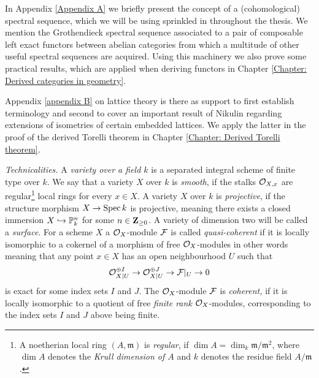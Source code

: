

In Appendix \ref{Appendix A} we briefly present the concept of a (cohomological) spectral sequence, which we will be using sprinkled in throughout the thesis. We mention the Grothendieck spectral sequence associated to a pair of composable left exact functors between abelian categories from which a multitude of other useful spectral sequences are acquired. Using this machinery we also prove some practical results, which are applied when deriving functors in Chapter \ref{Chapter: Derived categories in geometry}. 

Appendix \ref{appendix B} on lattice theory is there as support to first establish terminology and second to cover an important result of Nikulin \cite{Nikulin1980} regarding extensions of isometries of certain embedded lattices. We apply the latter in the proof of the derived Torelli theorem in Chapter \ref{Chapter: Derived Torelli theorem}. 

\vspace{0.3cm}
\noindent
\textsl{Technicalities.}
A \emph{variety over a field $k$} is a separated integral scheme of finite type over $k$. We say that a variety $X$ over $k$ is \emph{smooth}, if the stalks ${\mathcal{O}_{X, x}}$ are regular\footnote{A noetherian local ring $(A, \mathfrak{m})$ is \emph{regular}, if $\dim A = \dim_k \mathfrak{m}/\mathfrak{m}^2$, where $\dim A$ denotes the \emph{Krull dimension of $A$} and $k$ denotes the residue field $A/\mathfrak{m}$.} local rings for every $x \in X$. A variety $X$ over $k$ is \emph{projective}, if the structure morphism $X \to \operatorname{Spec}k$ is projective, meaning there exists a closed immersion $X \hookrightarrow \mathbb P^n_k$ for some $n \in \mathbf Z_{\geq 0}$. A variety of dimension two will be called a \emph{surface}. For a scheme $X$ a ${\mathcal{O}_{X}}$-module $\mathcal F$ is called \emph{quasi-coherent} if it is locally isomorphic to a cokernel of a morphism of free ${\mathcal{O}_{X}}$-modules in other words meaning that any point $x \in X$ has an open neighbourhood $U$ such that 
\[
    \mathcal O_{X|U}^{\oplus I} \to \mathcal O_{X|U}^{\oplus J} \to \mathcal F|_U \to 0
\]
is exact for some index sets $I$ and $J$. The ${\mathcal{O}_{X}}$-module $\mathcal F$ is \emph{coherent,} if it is locally isomorphic to a quotient of free \emph{finite rank} ${\mathcal{O}_{X}}$-modules, corresponding to the index sets $I$ and $J$ above being finite.